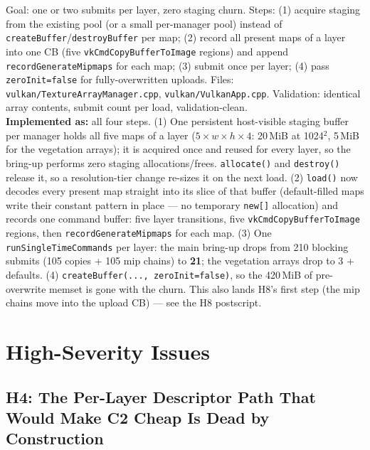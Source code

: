 \documentclass[11pt,a4paper]{article}
\begin{document}
\begin{tcolorbox}[promptbox={Prompt --- C3: batch the array bring-up}]
Goal: one or two submits per layer, zero staging churn. Steps: (1) acquire
staging from the existing pool (or a small per-manager pool) instead of
\texttt{createBuffer}/\texttt{destroyBuffer} per map; (2) record all present
maps of a layer into one CB (five \texttt{vkCmdCopyBufferToImage} regions) and
append \texttt{recordGenerateMipmaps} for each map; (3) submit once per layer;
(4) pass \texttt{zeroInit=false} for fully-overwritten uploads. Files:
\texttt{vulkan/TextureArrayManager.cpp}, \texttt{vulkan/VulkanApp.cpp}.
Validation: identical array contents, submit count per load, validation-clean.
\\ \textbf{Implemented as:} all four steps. (1) One persistent host-visible
staging buffer per manager holds all five maps of a layer
($5 \times w \times h \times 4$: 20\,MiB at 1024$^2$, 5\,MiB for the
vegetation arrays); it is acquired once and reused for every layer, so the
bring-up performs zero staging allocations/frees. \texttt{allocate()} and
\texttt{destroy()} release it, so a resolution-tier change re-sizes it on the
next load. (2) \texttt{load()} now decodes every present map straight into
its slice of that buffer (default-filled maps write their constant pattern in
place --- no temporary \texttt{new[]} allocation) and records one command
buffer: five layer transitions, five \texttt{vkCmdCopyBufferToImage} regions,
then \texttt{recordGenerateMipmaps} for each map. (3) One
\texttt{runSingleTimeCommands} per layer: the main bring-up drops from 210
blocking submits (105 copies + 105 mip chains) to \textbf{21}; the vegetation
arrays drop to 3 + defaults. (4) \texttt{createBuffer(..., zeroInit=false)},
so the 420\,MiB of pre-overwrite memset is gone with the churn. This also
lands H8's first step (the mip chains move into the upload CB) --- see the
H8 postscript.
\end{tcolorbox}

\section{High-Severity Issues}

\subsection{H4: The Per-Layer Descriptor Path That Would Make C2 Cheap Is Dead by Construction}
\label{sec:h4}
\end{document}
